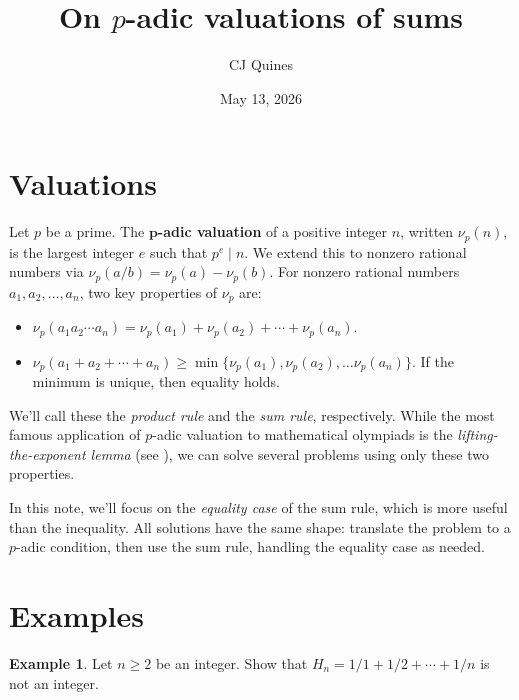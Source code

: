 \documentclass[11pt]{article}
\title{On $p$-adic valuations of sums}
\author{CJ Quines}
\date{May 13, 2026}
\theoremstyle{definition}
\newtheorem{example}{Example}
\begin{document}
\maketitle

\section{Valuations}

Let $p$ be a prime. The \textbf{$\boldsymbol{p}$-adic valuation} of a positive integer $n$, written $\nu_p(n)$, is the largest integer $e$ such that $p^e \mid n$. We extend this to nonzero rational numbers via $\nu_p(a/b) = \nu_p(a) - \nu_p(b)$. For nonzero rational numbers $a_1, a_2, \ldots, a_n$, two key properties of $\nu_p$ are:

\begin{itemize}
\item $\nu_p(a_1a_2 \cdots a_n) = \nu_p(a_1) + \nu_p(a_2) + \cdots + \nu_p(a_n)$.
\item $\nu_p(a_1 + a_2 + \cdots + a_n) \ge \min\{ \nu_p(a_1) , \nu_p(a_2), \ldots \nu_p(a_n) \}$. If the minimum is unique, then equality holds.
\end{itemize}

We'll call these the \textit{product rule} and the \textit{sum rule}, respectively. While the most famous application of $p$-adic valuation to mathematical olympiads is the \textit{lifting-the-exponent lemma} (see \cite{parvardi}), we can solve several problems using only these two properties.

In this note, we'll focus on the \textit{equality case} of the sum rule, which is more useful than the inequality. All solutions have the same shape: translate the problem to a $p$-adic condition, then use the sum rule, handling the equality case as needed.

\section{Examples}

\begin{example}
Let $n \ge 2$ be an integer. Show that $
  H_n = 1/1 + 1/2 + \cdots + 1/n
$ is not an integer.
\end{example}
\end{document}
